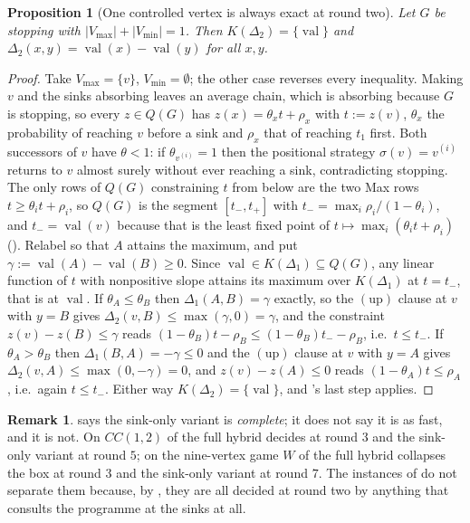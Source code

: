 \documentclass[11pt]{article}
\theoremstyle{plain}
\newtheorem{proposition}[theorem]{Proposition}
\theoremstyle{definition}
\newtheorem{remark}[theorem]{Remark}
\DeclareMathOperator{\val}{val}
\newcommand{\Vmax}{V_{\max}}
\newcommand{\Vmin}{V_{\min}}
\begin{document}
\begin{proposition}[One controlled vertex is always exact at round two]\label{prop:hybrid-onectrl}
Let $G$ be stopping with $|\Vmax|+|\Vmin|=1$. Then $K(\Delta_2)=\{\val\}$ and
$\Delta_2(x,y)=\val(x)-\val(y)$ for all $x,y$.
\end{proposition}

\begin{proof}
Take $\Vmax=\{v\}$, $\Vmin=\emptyset$; the other case reverses every
inequality. Making $v$ and the sinks absorbing leaves an average chain, which
is absorbing because $G$ is stopping, so every $z\in Q(G)$ has
$z(x)=\theta_x t+\rho_x$ with $t:=z(v)$, $\theta_x$ the probability of reaching
$v$ before a sink and $\rho_x$ that of reaching $t_1$ first. Both successors of
$v$ have $\theta<1$: if $\theta_{v^{(i)}}=1$ then the positional strategy
$\sigma(v)=v^{(i)}$ returns to $v$ almost surely without ever reaching a sink,
contradicting stopping. The only rows of $Q(G)$ constraining $t$ from below are
the two Max rows $t\ge\theta_{i}t+\rho_{i}$, so $Q(G)$ is the segment
$[t_-,t_+]$ with $t_-=\max_i\rho_i/(1-\theta_i)$, and $t_-=\val(v)$ because
that is the least fixed point of $t\mapsto\max_i(\theta_it+\rho_i)$
(). Relabel so that $A$ attains the maximum, and put
$\gamma:=\val(A)-\val(B)\ge0$. Since $\val\in K(\Delta_1)\subseteq Q(G)$, any
linear function of $t$ with nonpositive slope attains its maximum over
$K(\Delta_1)$ at $t=t_-$, that is at $\val$. If $\theta_A\le\theta_B$ then
$\Delta_1(A,B)=\gamma$ exactly, so the $(\mathrm{up})$ clause at $v$ with
$y=B$ gives $\Delta_2(v,B)\le\max(\gamma,0)=\gamma$, and the constraint
$z(v)-z(B)\le\gamma$ reads $(1-\theta_B)t-\rho_B\le(1-\theta_B)t_--\rho_B$,
i.e.\ $t\le t_-$. If $\theta_A>\theta_B$ then $\Delta_1(B,A)=-\gamma\le0$ and
the $(\mathrm{up})$ clause at $v$ with $y=A$ gives
$\Delta_2(v,A)\le\max(0,-\gamma)=0$, and $z(v)-z(A)\le0$ reads
$(1-\theta_A)t\le\rho_A$, i.e.\ again $t\le t_-$. Either way
$K(\Delta_2)=\{\val\}$, and 's last step applies.
\end{proof}

\begin{remark}\label{rem:hybrid-sink-slower}
 says the sink-only variant is \emph{complete}; it does
not say it is as fast, and it is not. On $CC(1,2)$ of
 the full hybrid decides at round $3$ and the sink-only
variant at round $5$; on the nine-vertex game $W$ of  the
full hybrid collapses the box at round $3$ and the sink-only variant at round
$7$. The instances of  do not separate them because,
by , they are all decided at round two by anything
that consults the programme at the sinks at all.
\end{remark}
\end{document}
